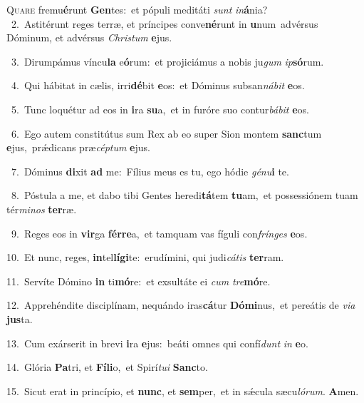 \lettrine{\initial\textcolor{\initialcolor}{Q}}{uare} fremu\-\textbf{é}\-runt \textbf{Gen}\-tes:~\star et pópuli meditáti \textit{sunt} \textit{in}\-\textbf{á}nia?\\
{\numbfont\textcolor{\numbcolor}{~2.}}~Astitérunt reges terræ, et príncipes conve\-\textbf{né}\-runt in \textbf{u}\-num~\star advérsus Dóminum, et advérsus \textit{Chris}\-\textit{tum} \textbf{e}\-jus.\par
{\numbfont\textcolor{\numbcolor}{~3.}}~Dirumpámus víncu\textbf{la} e\-\textbf{ó}\-rum:~\star et projiciámus a nobis ju\textit{gum} \textit{ip}\-\textbf{só}rum.\par
{\numbfont\textcolor{\numbcolor}{~4.}}~Qui hábitat in cælis, irri\-\textbf{dé}\-bit \textbf{e}\-os:~\star et Dóminus subsan\-\textit{ná}\-\textit{bit} \textbf{e}\-os.\par
{\numbfont\textcolor{\numbcolor}{~5.}}~Tunc loquétur ad eos in \textbf{i}\-ra \textbf{su}\-a,~\star et in furóre suo contur\-\textit{bá}\-\textit{bit} \textbf{e}\-os.\par
{\numbfont\textcolor{\numbcolor}{~6.}}~Ego autem constitútus sum Rex ab eo super Sion montem \textbf{sanc}\-tum \textbf{e}\-jus,~\star prǽdicans præ\-\textit{cép}\-\textit{tum} \textbf{e}\-jus.\par
{\numbfont\textcolor{\numbcolor}{~7.}}~Dóminus \textbf{di}\-xit \textbf{ad} me:~\star Fílius meus es tu, ego hódie \textit{gé}\-\textit{nu}\textbf{i} te.\par
{\numbfont\textcolor{\numbcolor}{~8.}}~Póstula a me, et dabo tibi Gentes heredi\-\textbf{tá}\-tem \textbf{tu}\-am,~\star et possessiónem tuam tér\-\textit{mi}\-\textit{nos} \textbf{ter}\-ræ.\par
{\numbfont\textcolor{\numbcolor}{~9.}}~Reges eos in \textbf{vir}\-ga \textbf{fér}\-\textbf{re}a,~\star et tamquam vas fíguli con\-\textit{frín}\-\textit{ges} \textbf{e}\-os.\par
{\numbfont\textcolor{\numbcolor}{10.}}~Et nunc, reges, \textbf{in}\-tel\-\textbf{lí}\-\textbf{gi}te:~\star erudímini, qui judi\-\textit{cá}\-\textit{tis} \textbf{ter}\-ram.\par
{\numbfont\textcolor{\numbcolor}{11.}}~Servíte Dómino \textbf{in} ti\-\textbf{mó}\-re:~\star et exsultáte ei \textit{cum} \textit{tre}\-\textbf{mó}re.\par
{\numbfont\textcolor{\numbcolor}{12.}}~Apprehéndite disciplínam, nequándo iras\-\textbf{cá}\-tur \textbf{Dó}\-\textbf{mi}nus,~\star et pereátis de \textit{vi}\-\textit{a} \textbf{jus}\-ta.\par
{\numbfont\textcolor{\numbcolor}{13.}}~Cum exárserit in brevi \textbf{i}\-ra \textbf{e}\-jus:~\star beáti omnes qui confí\textit{dunt} \textit{in} \textbf{e}\-o.\par
{\numbfont\textcolor{\numbcolor}{14.}}~Glória \textbf{Pa}\-tri, et \textbf{Fí}\-\textbf{li}o,~\star et Spirí\-\textit{tu}\-\textit{i} \textbf{Sanc}\-to.\par
{\numbfont\textcolor{\numbcolor}{15.}}~Sicut erat in princípio, et \textbf{nunc}\-, et \textbf{sem}\-per,~\star et in sǽcula sæcu\-\textit{ló}\-\textit{rum}. \textbf{A}\-men.\par
